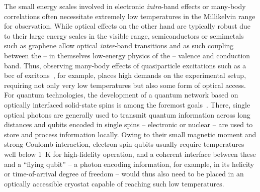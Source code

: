 The small energy scales involved in electronic \emph{intra}-band effects or many-body correlations often necessitate extremely low temperatures in the Millikelvin range for observation.
While optical effects on the other hand are typically robust due to their large energy scales in the visible range,
semiconductors or semimetals such as graphene allow optical \emph{inter}-band transitions and as such coupling between the -- in themselves low-energy physics of the -- valence and conduction band.
Thus, observing many-body effects of quasiparticle excitations such as a \gls{bec} of excitons~\cite{Kohn1970,High2012,Combescot2017,Morita2022,Zhang2024}, for example, places high demands on the experimental setup, requiring not only very low temperatures but also some form of optical access.
For quantum technologies, the development of a quantum network based on optically interfaced solid-state spins is among the foremost goals~\cite{Awschalom2018,Azuma2023,Heindel2023,Zajac2025}.
There, single optical photons are generally used to transmit quantum information across long distances and qubits encoded in single spins -- electronic or nuclear -- are used to store and process information locally.
Owing to their small magnetic moment and strong Coulomb interaction, electron spin qubits usually require temperatures well below \qty{1}{\kelvin} for high-fidelity operation, and a coherent interface between these and a \enquote{flying qubit} -- a photon encoding information, for example, in its helicity or time-of-arrival degree of freedom -- would thus also need to be placed in an optically accessible cryostat capable of reaching such low temperatures.

